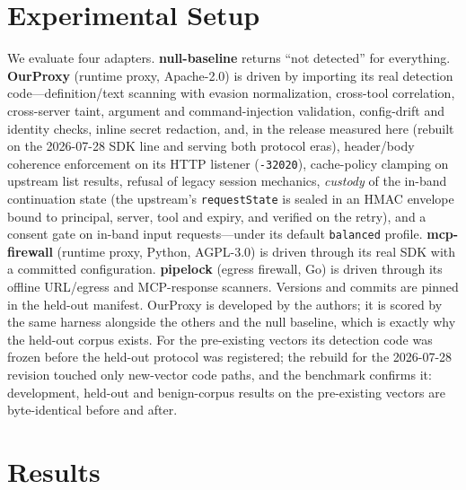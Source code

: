 \documentclass[conference]{IEEEtran}
\newcommand{\proxy}{OurProxy}
\newcommand{\rev}{2026-07-28}
\begin{document}
\section{Experimental Setup}\label{sec:setup}
We evaluate four adapters. \textbf{null-baseline} returns ``not detected'' for everything. \textbf{\proxy} (runtime proxy, Apache-2.0) is driven by importing its real detection code---definition/text scanning with evasion normalization, cross-tool correlation, cross-server taint, argument and command-injection validation, config-drift and identity checks, inline secret redaction, and, in the release measured here (rebuilt on the \rev{} SDK line and serving both protocol eras), header/body coherence enforcement on its HTTP listener (\texttt{-32020}), cache-policy clamping on upstream list results, refusal of legacy session mechanics, \emph{custody} of the in-band continuation state (the upstream's \texttt{requestState} is sealed in an HMAC envelope bound to principal, server, tool and expiry, and verified on the retry), and a consent gate on in-band input requests---under its default \texttt{balanced} profile. \textbf{mcp-firewall} (runtime proxy, Python, AGPL-3.0) is driven through its real SDK with a committed configuration. \textbf{pipelock} (egress firewall, Go) is driven through its offline URL/egress and MCP-response scanners. Versions and commits are pinned in the held-out manifest. \proxy{} is developed by the authors; it is scored by the same harness alongside the others and the null baseline, which is exactly why the held-out corpus exists. For the \nOrig{} pre-existing vectors its detection code was frozen before the held-out protocol was registered; the rebuild for the \rev{} revision touched only new-vector code paths, and the benchmark confirms it: development, held-out and benign-corpus results on the pre-existing vectors are byte-identical before and after.

\section{Results}\label{sec:results}
\begin{table}[t]
\caption{Headline: CorpusRobustCoverage on the \nOrig{} pre-existing vectors (development vs.\ held-out, gap in points), on the \nNew{} \rev{}-only vectors, and benign-corpus false positives. Matched-control FP is 0 for every tool on both paired corpora.}
\label{tab:headline}
\centering\scriptsize
\resizebox{\columnwidth}{!}{}
\end{table}
\end{document}
